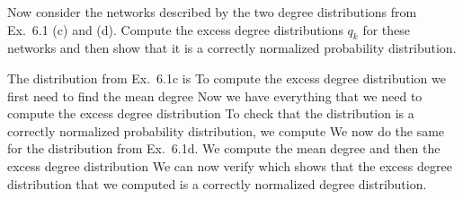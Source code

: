 

Now consider the networks described by the two degree distributions from Ex.~6.1 (c) and (d). Compute the excess degree distributions $q_k$ for these networks and then show that it is a correctly normalized probability distribution. 

\solution
The distribution from Ex.~6.1c is 
To compute the excess degree distribution we first need to find the mean degree
Now we have everything that we need to compute the excess degree distribution
To check that the distribution is a correctly normalized probability distribution, we compute
We now do the same for the distribution from Ex.~6.1d. We compute the mean degree
and then the excess degree distribution
We can now verify
which shows that the excess degree distribution that we computed is a correctly normalized degree distribution. 
